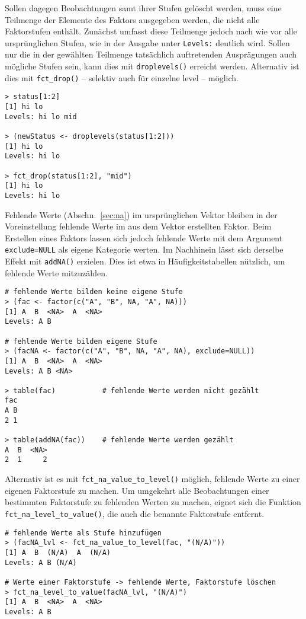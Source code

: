Sollen dagegen Beobachtungen samt ihrer Stufen gelöscht werden, muss eine Teilmenge der Elemente des Faktors ausgegeben werden, die nicht alle Faktorstufen enthält. Zunächst umfasst diese Teilmenge jedoch nach wie vor alle ursprünglichen Stufen, wie in der Ausgabe unter \lstinline!Levels:! deutlich wird. Sollen nur die in der gewählten Teilmenge tatsächlich auftretenden Ausprägungen auch mögliche Stufen sein, kann dies mit \lstinline!droplevels()! erreicht werden. Alternativ ist dies mit \lstinline!fct_drop()! -- selektiv auch für einzelne level -- möglich.
\begin{lstlisting}
> status[1:2]
[1] hi lo
Levels: hi lo mid

> (newStatus <- droplevels(status[1:2]))
[1] hi lo
Levels: hi lo

> fct_drop(status[1:2], "mid")
[1] hi lo
Levels: hi lo
\end{lstlisting}

Fehlende Werte (Abschn.\ \ref{sec:na}) im ursprünglichen Vektor bleiben in der Voreinstellung fehlende Werte im aus dem Vektor erstellten Faktor. Beim Erstellen eines Faktors lassen sich jedoch fehlende Werte mit dem Argument \lstinline!exclude=NULL! als eigene Kategorie werten. Im Nachhinein lässt sich derselbe Effekt mit \lstinline!addNA()! erzielen. Dies ist etwa in Häufigkeitstabellen nützlich, um fehlende Werte mitzuzählen.
\begin{lstlisting}
# fehlende Werte bilden keine eigene Stufe
> (fac <- factor(c("A", "B", NA, "A", NA)))
[1] A  B  <NA>  A  <NA>
Levels: A B

# fehlende Werte bilden eigene Stufe
> (facNA <- factor(c("A", "B", NA, "A", NA), exclude=NULL))
[1] A  B  <NA>  A  <NA>
Levels: A B <NA>

> table(fac)           # fehlende Werte werden nicht gezählt
fac
A B 
2 1 

> table(addNA(fac))    # fehlende Werte werden gezählt
A  B  <NA> 
2  1     2 
\end{lstlisting}

Alternativ ist es mit \lstinline!fct_na_value_to_level()! möglich, fehlende Werte zu einer eigenen Faktorstufe zu machen. Um umgekehrt alle Beobachtungen einer bestimmten Faktorstufe zu fehlenden Werten zu machen, eignet sich die Funktion \lstinline!fct_na_level_to_value()!, die auch die benannte Faktorstufe entfernt.
\begin{lstlisting}
# fehlende Werte als Stufe hinzufügen
> (facNA_lvl <- fct_na_value_to_level(fac, "(N/A)"))
[1] A  B  (N/A)  A  (N/A)
Levels: A B (N/A)

# Werte einer Faktorstufe -> fehlende Werte, Faktorstufe löschen
> fct_na_level_to_value(facNA_lvl, "(N/A)")
[1] A  B  <NA>  A  <NA>
Levels: A B
\end{lstlisting}

